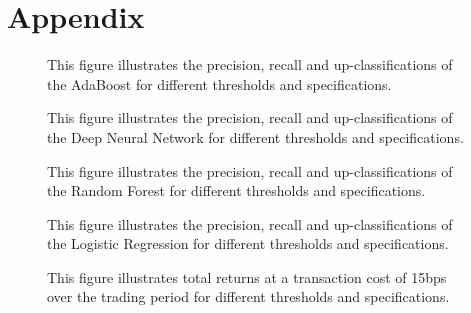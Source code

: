 \section{Appendix}
\begin{figure}[H]
    \captionsetup{format=plain}
    \caption{ 
            This figure illustrates the precision, recall and up-classifications of the 
            AdaBoost for different thresholds and specifications.
        }
    \label{fig:adaboost_threshold_vs_precision}
\end{figure}

\begin{figure}[H]
    \captionsetup{format=plain}
    \caption{ 
            This figure illustrates the precision, recall and up-classifications of the Deep Neural Network for different thresholds
            and specifications.
        }
    \label{fig:ann_threshold_vs_precision}
\end{figure}

\begin{figure}[H]
    \captionsetup{format=plain}
    \caption{ 
            This figure illustrates the precision, recall and up-classifications of the Random Forest for different thresholds
            and specifications.
        }
    \label{fig:forest_threshold_vs_precision}
\end{figure}

\begin{figure}[H]
    \captionsetup{format=plain}
    \caption{ 
            This figure illustrates the precision, recall and up-classifications of the Logistic Regression for different thresholds
            and specifications.
        }
    \label{fig:logistic_threshold_vs_precision}
\end{figure}


\begin{figure}[H]
    \captionsetup{format=plain}
    \caption{ 
        This figure illustrates total returns at a transaction cost of 15bps over the trading period for different thresholds
        and specifications.
        }
    \label{fig:all_threshold_vs_return}
\end{figure}


